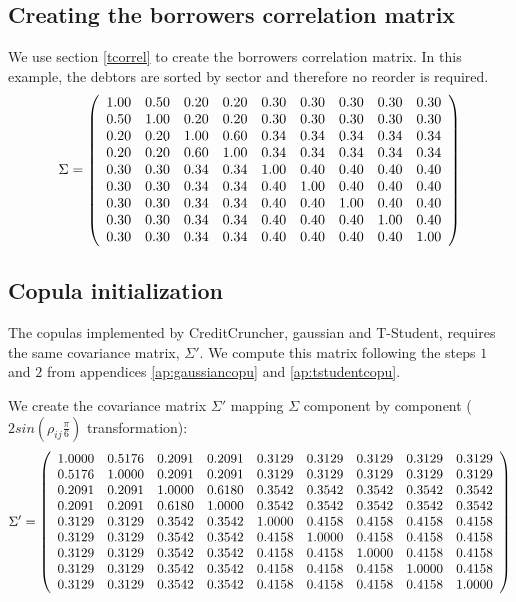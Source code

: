 \documentclass[a4paper,12pt,final]{article}
\begin{document}
\clearpage 

\subsection{Creating the borrowers correlation matrix}

We use section \ref{tcorrel} to create the borrowers correlation matrix. In 
this example, the debtors are sorted by sector and therefore no reorder is 
required.
\begin{displaymath}
\Sigma = 
\left( 
\begin{array}{ccccccccc}
 1.00 & 0.50 & 0.20 & 0.20 & 0.30 & 0.30 & 0.30 & 0.30 & 0.30 \cr
 0.50 & 1.00 & 0.20 & 0.20 & 0.30 & 0.30 & 0.30 & 0.30 & 0.30 \cr
 0.20 & 0.20 & 1.00 & 0.60 & 0.34 & 0.34 & 0.34 & 0.34 & 0.34 \cr
 0.20 & 0.20 & 0.60 & 1.00 & 0.34 & 0.34 & 0.34 & 0.34 & 0.34 \cr
 0.30 & 0.30 & 0.34 & 0.34 & 1.00 & 0.40 & 0.40 & 0.40 & 0.40 \cr
 0.30 & 0.30 & 0.34 & 0.34 & 0.40 & 1.00 & 0.40 & 0.40 & 0.40 \cr
 0.30 & 0.30 & 0.34 & 0.34 & 0.40 & 0.40 & 1.00 & 0.40 & 0.40 \cr
 0.30 & 0.30 & 0.34 & 0.34 & 0.40 & 0.40 & 0.40 & 1.00 & 0.40 \cr
 0.30 & 0.30 & 0.34 & 0.34 & 0.40 & 0.40 & 0.40 & 0.40 & 1.00 \cr
\end{array}
\right)
\end{displaymath}

\subsection{Copula initialization}

The copulas implemented by CreditCruncher, gaussian and T-Student, 
requires the same covariance matrix, $\Sigma'$. We compute this matrix
following the steps $1$ and $2$ from appendices \ref{ap:gaussiancopu} 
and \ref{ap:tstudentcopu}.
\newline

We create the covariance matrix $\Sigma'$ mapping $\Sigma$ component 
by component ($2 sin(\rho_{ij} \frac{\pi}{6})$ transformation):
{\small
\begin{displaymath}
\Sigma' = 
\left( 
\begin{array}{ccccccccc}
   1.0000 & 0.5176 & 0.2091 & 0.2091 & 0.3129 & 0.3129 & 0.3129 & 0.3129 & 0.3129 \cr
   0.5176 & 1.0000 & 0.2091 & 0.2091 & 0.3129 & 0.3129 & 0.3129 & 0.3129 & 0.3129 \cr
   0.2091 & 0.2091 & 1.0000 & 0.6180 & 0.3542 & 0.3542 & 0.3542 & 0.3542 & 0.3542 \cr
   0.2091 & 0.2091 & 0.6180 & 1.0000 & 0.3542 & 0.3542 & 0.3542 & 0.3542 & 0.3542 \cr
   0.3129 & 0.3129 & 0.3542 & 0.3542 & 1.0000 & 0.4158 & 0.4158 & 0.4158 & 0.4158 \cr
   0.3129 & 0.3129 & 0.3542 & 0.3542 & 0.4158 & 1.0000 & 0.4158 & 0.4158 & 0.4158 \cr
   0.3129 & 0.3129 & 0.3542 & 0.3542 & 0.4158 & 0.4158 & 1.0000 & 0.4158 & 0.4158 \cr
   0.3129 & 0.3129 & 0.3542 & 0.3542 & 0.4158 & 0.4158 & 0.4158 & 1.0000 & 0.4158 \cr
   0.3129 & 0.3129 & 0.3542 & 0.3542 & 0.4158 & 0.4158 & 0.4158 & 0.4158 & 1.0000 \cr
\end{array}
\right)
\end{displaymath}
}
\end{document}
